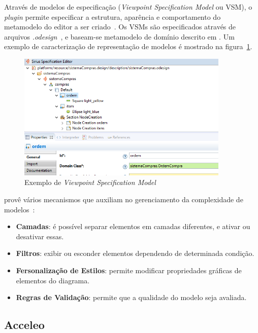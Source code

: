 Através de modelos de especificação (\textit{Viewpoint Specification Model} ou VSM), o \textit{plugin} permite especificar a estrutura, aparência e comportamento do metamodelo do editor a ser criado~\cite{viyovic2014sirius}. Os VSMs são especificados através de arquivos \textit{.odesign}~\cite{viyovic2014sirius}, e baseam-se metamodelo de domínio descrito em \ecore. Um exemplo de caracterização de representação de modelos é mostrado na figura~\ref{exemplo-sirius}.

\begin{figure}[h]
	\centering
	\includegraphics[width=0.9\textwidth]{figuras/exemplos-emf/exemplo-sirius-vsm.png}
	\caption{Exemplo de \textit{Viewpoint Specification Model}}
	\label{exemplo-sirius}
\end{figure}

\sirius provê vários mecanismos que auxiliam no gerenciamento da complexidade de modelos~\cite{madiot2015eclipse}:

\begin{itemize}
	\item \textbf{Camadas}: é possível separar elementos em camadas diferentes, e ativar ou desativar essas.
	\item \textbf{Filtros}: exibir ou esconder elementos dependendo de determinada condição.
	\item \textbf{Fersonalização de Estilos}: permite modificar propriedades gráficas de elementos do diagrama.
	\item \textbf{Regras de Validação}: permite que a qualidade do modelo seja avaliada.
\end{itemize}

\subsection{Acceleo}

